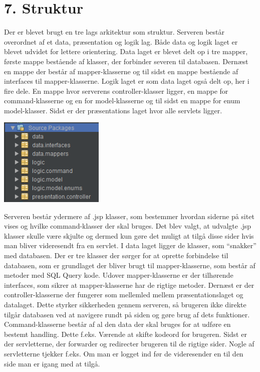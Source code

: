 \documentclass[11pt]{report}
\begin{document}
\chapter*{7. Struktur}
Der er blevet brugt en tre lags arkitektur som struktur. Serveren
består overordnet af et data, præsentation og logik lag. Både data og
logik laget er blevet udvidet for lettere orientering. Data laget er
blevet delt op i tre mapper, første mappe bestående af klasser, der
forbinder severen til databasen. Dernæst en mappe der består af
mapper-klasserne og til sidst en mappe bestående af interfaces til
mapper-klasserne. Logik laget er som data laget også delt op, her i
fire dele. En mappe hvor serverens controller-klasser ligger, en mappe
for command-klasserne og en for model-klasserne og til sidst en mappe
for enum model-klasser. Sidst er der præsentations laget hvor alle servlets ligger.
\begin{center}
\includegraphics[width=5cm]{Arkitektur.png}
\end{center}
Serveren består ydermere af .jsp klasser, som bestemmer hvordan siderne på sitet vises og hvilke command-klasser der skal bruges.
Det blev valgt, at udvalgte .jsp klasser skulle være skjulte og dermed
kun gøre det muligt at tilgå disse sider hvis man bliver videresendt
fra en servlet. I data laget ligger de klasser, som “snakker” med
databasen. Der er tre klasser der sørger for at oprette forbindelse
til databasen, som er grundlaget der bliver brugt til
mapper-klasserne, som består af metoder med SQL Query kode. Udover
mapper-klasserne er der tilhørende interfaces, som sikrer at
mapper-klasserne har de rigtige metoder. Dernæst er der
controller-klasserne der fungerer som mellemled mellem
præsentationslaget og datalaget. Dette styrker sikkerheden gennem
serveren, så brugeren ikke direkte tilgår databasen ved at navigere
rundt på siden og gøre brug af dets funktioner. Command-klasserne
består af al den data der skal bruges for at udføre en bestemt
handling. Dette f.eks. Værende at skifte kodeord for brugeren. Sidst er der servletterne, der forwarder og redirecter brugeren til de rigtige sider. Nogle af servletterne tjekker f.eks. Om man er logget ind før de videresender en til den side man er igang med at tilgå.
\end{document}
